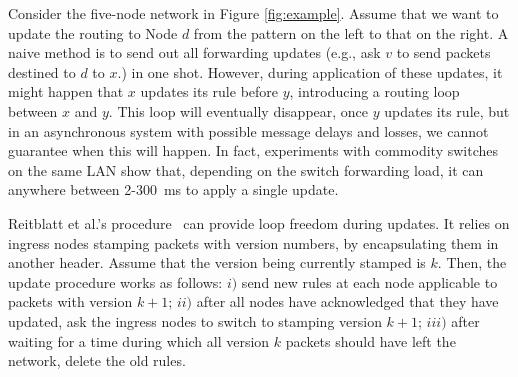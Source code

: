 Consider the five-node network in Figure \ref{fig:example}. Assume that we want to update the routing to Node $d$ from the pattern on the left to that on the right. A naive method is to send out all forwarding updates (e.g., ask $v$ to send packets destined to $d$ to $x$.) in one shot. However, during application of these updates, it might happen that $x$ updates its rule before $y$, introducing a routing loop between $x$ and $y$. This loop will eventually disappear, once $y$ updates its rule, but in an asynchronous system with possible message delays and losses, we cannot guarantee when this will happen. In fact, experiments with commodity switches on the same LAN show that, depending on the switch forwarding load, it can anywhere between 2-300~ms to apply a single update.

Reitblatt et al.'s procedure~\cite{safeupdate} can provide loop freedom during updates. It  relies on ingress nodes stamping packets with version numbers, by encapsulating them in another header. Assume that the version being currently stamped is $k.$ Then, the update procedure works as follows: $i)$ send new rules at each node applicable to packets with version $k+1$; $ii)$ after all nodes have acknowledged that they have updated, ask the ingress nodes to switch to stamping version $k+1$; $iii)$ after waiting for a time during which all version $k$ packets should have left the network, delete the old rules.


